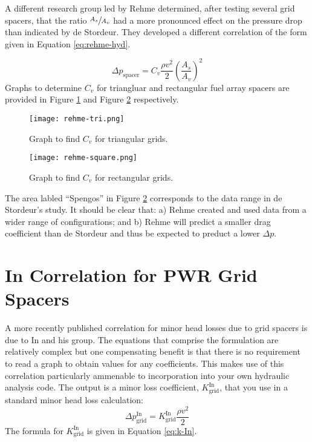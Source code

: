 A different research group led by Rehme determined, after testing several grid spacers, that the ratio $\sfrac{A_s}{A_v}$ had a more pronounced effect on the pressure drop than indicated by de Stordeur.  They developed a different correlation\cite{rehme1973pressure} of the form given in Equation \ref{eq:rehme-hyd}.

\begin{equation}
\Delta p_{\text{spacer}}=C_v \frac{\rho v^2}{2}\left(\frac{A_s}{A_v} \right)^2
\label{eq:rehme-hyd}
\end{equation} 
Graphs to determine $C_v$ for triangluar and rectangular fuel array spacers are provided in Figure \ref{fig:rehme-tri} and Figure \ref{fig:rehme-square} respectively.

\begin{figure}
\texttt{[image: rehme-tri.png]}
\caption{Graph to find $C_v$ for triangular grids.}
\label{fig:rehme-tri}
\end{figure}

\begin{figure}
\texttt{[image: rehme-square.png]}
\caption{Graph to find $C_v$ for rectangular grids.}
\label{fig:rehme-square}
\end{figure}
The area labled ``Spengos'' in Figure \ref{fig:rehme-square} corresponds to the data range in de Stordeur's study.  It should be clear that: a) Rehme created and used data from a wider range of configurations; and b) Rehme will predict a smaller drag coefficient than de Stordeur and thus be expected to preduct a lower $\Delta p$.

\section{In Correlation for PWR Grid Spacers} 
A more recently published correlation\cite{in2002empirical} for minor head losses due to grid spacers is due to In and his group.  The equations that comprise the formulation are relatively complex but one compensating benefit is that there is no requirement to read a graph to obtain values for any coefficients.  This makes use of this correlation particularly ammenable to incorporation into your own hydraulic analysis code.  The output is a minor loss coefficient, $K_{\text{grid}}^{\text{In}}$, that you use in a standard minor head loss calculation:
$$\Delta p_{\text{grid}}^{\text{In}} = K_{\text{grid}}^{\text{In}}\frac{\rho v^2}{2}$$
The formula for $K_{\text{grid}}^{\text{In}}$ is given in Equation \ref{eq:k-In}.

